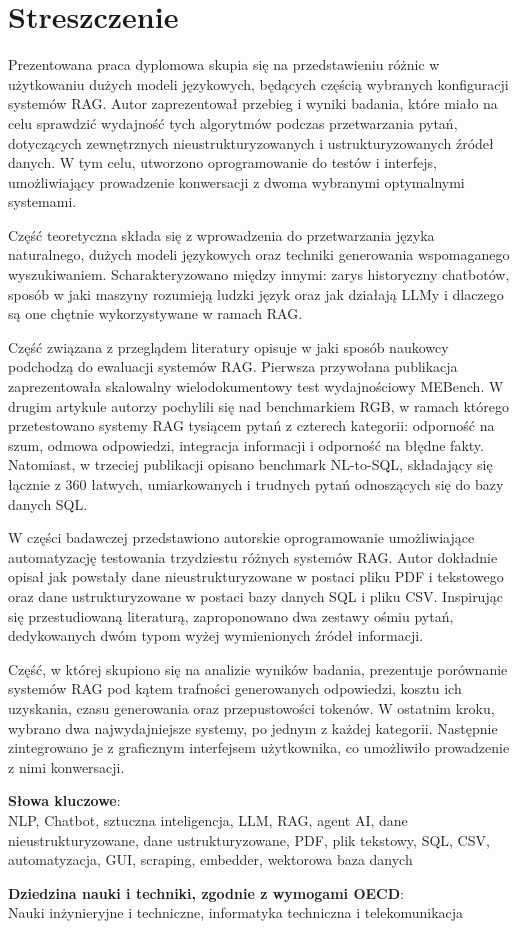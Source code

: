 \chapter*{Streszczenie}
Prezentowana praca dyplomowa skupia się na przedstawieniu różnic w użytkowaniu dużych modeli językowych, będących częścią wybranych konfiguracji systemów RAG. Autor zaprezentował przebieg i wyniki badania, które miało na celu sprawdzić wydajność tych algorytmów podczas przetwarzania pytań, dotyczących zewnętrznych nieustrukturyzowanych i ustrukturyzowanych źródeł danych. W tym celu, utworzono oprogramowanie do testów i interfejs, umożliwiający prowadzenie konwersacji z dwoma wybranymi optymalnymi systemami.

Część teoretyczna składa się z wprowadzenia do przetwarzania języka naturalnego, dużych modeli językowych oraz techniki generowania wspomaganego wyszukiwaniem. Scharakteryzowano między innymi: zarys historyczny chatbotów, sposób w jaki maszyny rozumieją ludzki język oraz jak działają LLMy i dlaczego są one chętnie wykorzystywane w ramach RAG.

Część związana z przeglądem literatury opisuje w jaki sposób naukowcy podchodzą do ewaluacji systemów RAG. Pierwsza przywołana publikacja zaprezentowała skalowalny wielodokumentowy test wydajnościowy MEBench. W drugim artykule autorzy pochylili się nad benchmarkiem RGB, w ramach którego przetestowano systemy RAG tysiącem pytań z czterech kategorii: odporność na szum, odmowa odpowiedzi, integracja informacji i odporność na błędne fakty. Natomiast, w trzeciej publikacji opisano benchmark NL-to-SQL, składający się łącznie z 360 łatwych, umiarkowanych i trudnych pytań odnoszących się do bazy danych SQL.

W części badawczej przedstawiono autorskie oprogramowanie umożliwiające automatyzację testowania trzydziestu różnych systemów RAG. Autor dokładnie opisał jak powstały dane nieustrukturyzowane w postaci pliku PDF i tekstowego  oraz dane ustrukturyzowane w postaci bazy danych SQL i pliku CSV. Inspirując się przestudiowaną literaturą, zaproponowano dwa zestawy ośmiu pytań, dedykowanych dwóm typom wyżej wymienionych źródeł informacji.

Część, w której skupiono się na analizie wyników badania, prezentuje porównanie systemów RAG pod kątem trafności generowanych odpowiedzi, kosztu ich uzyskania, czasu generowania oraz przepustowości tokenów. W ostatnim kroku, wybrano dwa najwydajniejsze systemy, po jednym z każdej kategorii. Następnie zintegrowano je z graficznym interfejsem użytkownika, co umożliwiło prowadzenie z nimi konwersacji.



\bigskip
\bigskip

\noindent \textbf{Słowa kluczowe}: \\
NLP, Chatbot, sztuczna inteligencja, LLM, RAG, agent AI, dane nieustrukturyzowane, dane ustrukturyzowane, PDF, plik tekstowy, SQL, CSV, automatyzacja, GUI, scraping, embedder, wektorowa baza danych


\bigskip

\noindent \textbf{Dziedzina nauki i techniki, zgodnie z wymogami OECD}: \\
Nauki inżynieryjne i techniczne, informatyka techniczna i telekomunikacja